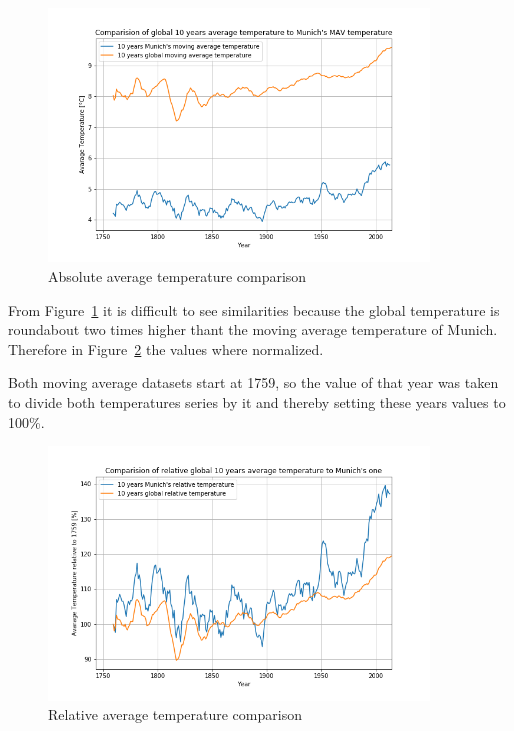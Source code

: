\documentclass[DIV=11, a4paper, parskip=true]{scrartcl}
\begin{document}
\begin{figure}[H]
    \centering
    \includegraphics[width=0.9\textwidth]{comparison_average_temperatures.png}
    \caption{Absolute average temperature comparison}
    \label{comparison}
\end{figure}

From Figure~\ref{comparison} it is difficult to see similarities because the global temperature
is roundabout two times higher thant the moving average temperature of Munich. Therefore in
Figure~\ref{rel_comparison} the values where normalized.

Both moving average datasets start at 1759, so the value of that year was taken to divide both
temperatures series by it and thereby setting these years values to 100\%.

\begin{figure}[H]
    \centering
    \includegraphics[width=0.9\textwidth]{rel_comparison_average_temperatures.png}
    \caption{Relative average temperature comparison}
    \label{rel_comparison}
\end{figure}
\end{document}
